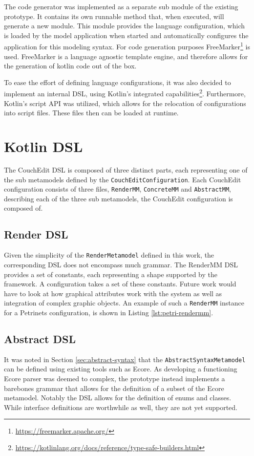 The code generator was implemented as a separate sub module of the existing prototype. It contains its own runnable method that, when executed, will generate a new module. This module provides the language configuration, which is loaded by the model application when started and automatically configures the application for this modeling syntax. For code generation purposes FreeMarker\footnote{\url{https://freemarker.apache.org/}} is used. FreeMarker is a language agnostic template engine, and therefore allows for the generation of kotlin code out of the box.

To ease the effort of defining language configurations, it was also decided to implement an internal DSL, using Kotlin's integrated capabilities\footnote{\url{https://kotlinlang.org/docs/reference/type-safe-builders.html}}. Furthermore, Kotlin's script API was utilized, which allows for the relocation of configurations into script files. These files then can be loaded at runtime.

\section{Kotlin DSL}
The CouchEdit DSL is composed of three distinct parts, each representing one of the sub metamodels defined by the \texttt{CouchEditConfiguration}. Each CouchEdit configuration consists of three files, \texttt{RenderMM}, \texttt{ConcreteMM} and \texttt{AbstractMM}, describing each of the three sub metamodels, the CouchEdit configuration is composed of.

\subsection{Render DSL}
Given the simplicity of the \texttt{RenderMetamodel} defined in this work, the corresponding DSL does not encompass much grammar. The RenderMM DSL provides a set of constants, each representing a shape supported by the framework. A configuration takes a set of these constants. Future work would have to look at how graphical attributes work with the system as well as integration of complex graphic objects. An example of such a \texttt{RenderMM} instance for a Petrinets configuration, is shown in Listing \ref{lst:petri-rendermm}.

\subsection{Abstract DSL}
It was noted in Section \ref{sec:abstract-syntax} that the \texttt{AbstractSyntaxMetamodel} can be defined using existing tools such as Ecore. As developing a functioning Ecore parser was deemed to complex, the prototype instead implements a barebones grammar that allows for the definition of a subset of the Ecore metamodel. Notably the DSL allows for the definition of enums and classes. While interface definitions are worthwhile as well, they are not yet supported.

